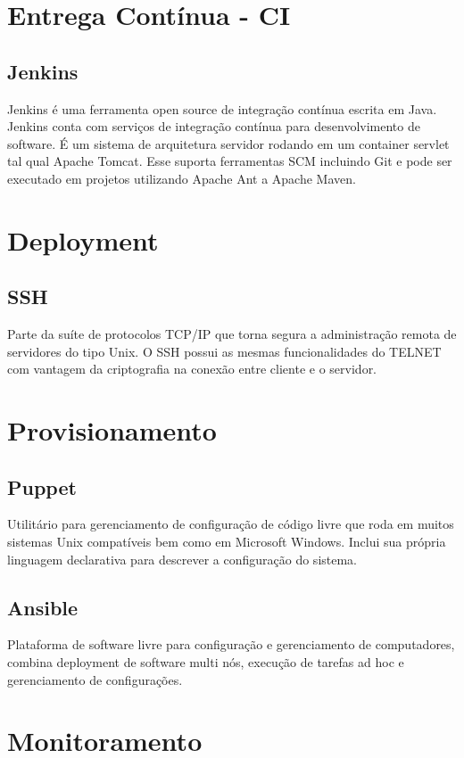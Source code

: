     \section{Entrega Contínua - CI}
	\subsection{Jenkins} Jenkins é uma ferramenta open source de 
	integração contínua escrita em Java. Jenkins conta com serviços 
	de integração contínua para desenvolvimento de software. 
	É um sistema de arquitetura servidor rodando em um container 
	servlet tal qual Apache Tomcat. Esse suporta ferramentas SCM 
	incluindo Git e pode ser executado em projetos utilizando 
	Apache Ant a Apache Maven.

    \section{Deployment}
	\subsection{SSH}Parte da suíte de protocolos TCP/IP que torna 
	segura a administração remota de servidores do tipo Unix. O SSH 
	possui as mesmas funcionalidades do TELNET com vantagem da 
	criptografia na conexão entre cliente e o servidor.

    \section{Provisionamento}

	\subsection{Puppet} Utilitário para gerenciamento de configuração de 
	código livre que roda em muitos sistemas Unix compatíveis bem como 
	em Microsoft Windows. Inclui sua própria linguagem declarativa para 
	descrever a configuração do sistema.

	\subsection{Ansible} Plataforma de software livre para configuração e 
	gerenciamento de computadores, combina deployment de software multi 
	nós, execução de tarefas ad hoc e gerenciamento de configurações.

    \section{Monitoramento}

